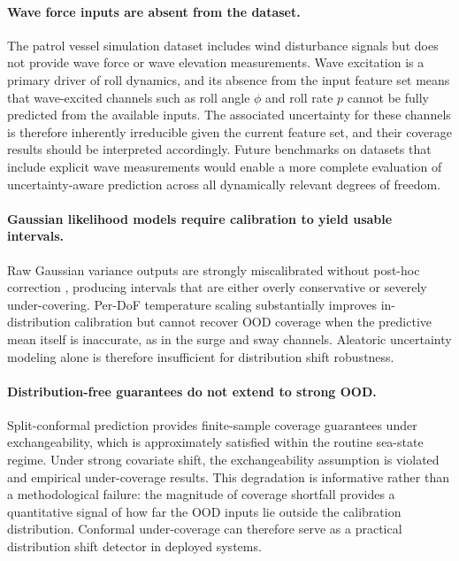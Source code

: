 \documentclass[a4paper,fleqn]{cas-sc}
\begin{document}
\paragraph{Wave force inputs are absent from the dataset.}
The patrol vessel simulation dataset includes wind disturbance signals but does not provide wave force or wave elevation measurements. Wave excitation is a primary driver of roll dynamics, and its absence from the input feature set means that wave-excited channels such as roll angle $\phi$ and roll rate $p$ cannot be fully predicted from the available inputs. The associated uncertainty for these channels is therefore inherently irreducible given the current feature set, and their coverage results should be interpreted accordingly. Future benchmarks on datasets that include explicit wave measurements would enable a more complete evaluation of uncertainty-aware prediction across all dynamically relevant degrees of freedom.

\paragraph{Gaussian likelihood models require calibration to yield usable intervals.}
Raw Gaussian variance outputs are strongly miscalibrated without post-hoc correction \cite{guo2017calibration, ovadia2019can}, producing intervals that are either overly conservative or severely under-covering. Per-DoF temperature scaling \cite{guo2017calibration} substantially improves in-distribution calibration but cannot recover OOD coverage when the predictive mean itself is inaccurate, as in the surge and sway channels. Aleatoric uncertainty modeling alone is therefore insufficient for distribution shift robustness.

\paragraph{Distribution-free guarantees do not extend to strong OOD.}
Split-conformal prediction provides finite-sample coverage guarantees under exchangeability, which is approximately satisfied within the routine sea-state regime. Under strong covariate shift, the exchangeability assumption is violated and empirical under-coverage results. This degradation is informative rather than a methodological failure: the magnitude of coverage shortfall provides a quantitative signal of how far the OOD inputs lie outside the calibration distribution. Conformal under-coverage can therefore serve as a practical distribution shift detector in deployed systems.
\end{document}
